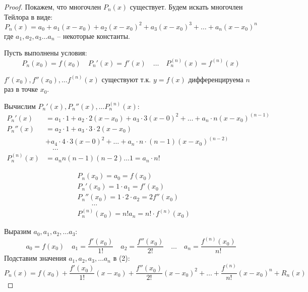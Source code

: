\begin{proof}
  Покажем, что многочлен $P_n(x)$ существует. Будем искать многочлен Тейлора в виде:  \[
    P_n(x) = a_0 + a_1 (x - x_0) + a_2 (x - x_0)^2 + a_3 (x - x_0)^3 + \ldots + a_n (x - x_0)^n \tag{2} 
  \]
  где $a_1, a_2, a_3 \ldots a_n$ -- некоторые константы.

  Пусть выполнены условия: \[
    P_n(x_0) = f(x_0) \quad P_n'(x) = f'(x) \quad \ldots \quad P_n^{(n)}(x) = f^{(n)}(x) \tag{3} 
  \] 

  $f'(x_0), f''(x_0), \ldots f^{(n)}(x)$ существуют т.к. $y = f(x)$ дифференцируема $n$ раз в точке $x_0$.

  Вычислим $P_n'(x), P_n''(x), \ldots P_n^{(n)}(x)$:
  \begin{align*}
    P_n'(x) &= a_1 \cdot 1 + a_2 \cdot 2(x - x_0) + a_3 \cdot 3(x - 0)^2 + \ldots + a_n \cdot n (x - x_0)^{(n-1)} \\
    P_n''(x) &= a_2 \cdot 1 + a_3 \cdot 3 \cdot 2(x - x_0) \\
             &+ a_4 \cdot 4 \cdot 3(x - 0)^2 + \ldots + a_n \cdot n \cdot (n - 1)(x - x_0)^{(n-2)} \\
              & \quad \ldots \\
    P_n^{(n)}(x) &= a_n n (n - 1)(n - 2) \ldots 1 = a_n \cdot n!
  \end{align*}

  \begin{align*}
    &P_n(x_0) = a_0 = f(x_0) \\
    &P_n'(x_0) = 1 \cdot a_1 = f'(x_0) \\
    &P_n''(x_0) = 1 \cdot 2 \cdot a_2 = 2 f''(x_0)\\
    & \qquad \ldots \\
    &P_n^{(n)}(x_0) = n! a_n = n! \cdot f^{(n)}(x_0)
  \end{align*}

  Выразим $a_0, a_1, a_2, \ldots a_3$: \[
     a_0  = f(x_0) 
     \quad a_1 = \frac{f'(x_0)}{1!}
     \quad a_2 = \frac{f''(x_0)}{2!}
      \quad \ldots
    \quad a_n = \frac{f^{(n)}(x_0)}{n!}
  \]
  Подставим значения $a_1, a_2, a_3, \ldots a_n$ в (2): \[
    P_n(x) = f(x_0) + \frac{f'(x_0)}{1!}(x - x_0) + \frac{f''(x_0)}{2!}(x - x_0)^2 + \ldots + \frac{f^{(n)}}{n!}(x - x_0)^n + R_n(x)
  \] 
\end{proof}

